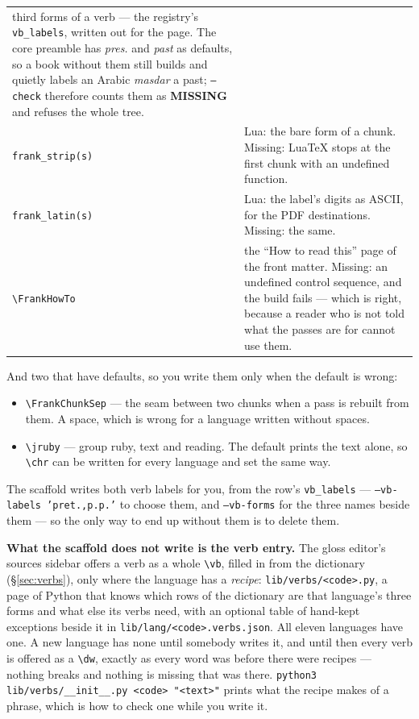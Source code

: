 \documentclass[11pt,oneside]{report}
\newcommand{\file}[1]{\texttt{#1}}
\newcommand{\menu}[1]{\textsf{#1}}
\begin{document}
\begin{center}
\begin{longtable}{@{}>{\raggedright\arraybackslash}p{}p{}@{}}
  third forms of a verb --- the registry's \texttt{vb\_labels}, written out
  for the page. The core preamble has \emph{pres.} and \emph{past} as
  defaults, so a book without them still builds and quietly labels an Arabic
  \emph{masdar} a past; \texttt{--check} therefore counts them as
  \textbf{MISSING} and refuses the whole tree. \\
\addlinespace
\texttt{frank\_strip(s)} & Lua: the bare form of a chunk. Missing: LuaTeX stops
  at the first chunk with an undefined function. \\
\addlinespace
\texttt{frank\_latin(s)} & Lua: the label's digits as ASCII, for the PDF
  destinations. Missing: the same. \\
\addlinespace
\texttt{\textbackslash FrankHowTo} & the ``How to read this'' page of the front
  matter. Missing: an undefined control sequence, and the build fails ---
  which is right, because a reader who is not told what the passes are for
  cannot use them. \\
\bottomrule
\end{longtable}
\end{center}

\noindent And two that have defaults, so you write them only when the
default is wrong:

\begin{itemize}
\item \texttt{\textbackslash FrankChunkSep} --- the seam between two chunks
  when a pass is rebuilt from them. A space, which is wrong for a language
  written without spaces.
\item \texttt{\textbackslash jruby} --- group ruby, text and reading. The
  default prints the text alone, so \texttt{\textbackslash chr} can be
  written for every language and set the same way.
\end{itemize}

\noindent The scaffold writes both verb labels for you, from the row's
\texttt{vb\_labels} --- \texttt{--vb-labels 'pret.,p.p.'} to choose them, and
\texttt{--vb-forms} for the three names beside them ---
so the only way to end up without them is to delete them.

\textbf{What the scaffold does not write is the verb entry.} The gloss
editor's \menu{sources} sidebar offers a verb as a whole
\texttt{\textbackslash vb}, filled in from the dictionary
(\S\ref{sec:verbs}), only where the language has a
\emph{recipe}: \file{lib/verbs/<code>.py}, a page of Python that knows which
rows of the dictionary are that language's three forms and what else its
verbs need, with an optional table of hand-kept exceptions beside it in
\file{lib/lang/<code>.verbs.json}. All eleven languages have one. A new
language has none until somebody writes it, and until then every verb is
offered as a \texttt{\textbackslash dw}, exactly as every word was before
there were recipes --- nothing breaks and nothing is missing that was there.
\texttt{python3 lib/verbs/\_\_init\_\_.py <code> "<text>"} prints what the
recipe makes of a phrase, which is how to check one while you write it.
\end{document}
